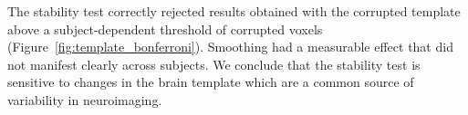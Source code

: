 \documentclass[lettersize,journal]{IEEEtran}
\newcommand{\TG}[1]{\color{orange}\textsc{From Tristan:} #1\color{black}\xspace}
\begin{document}
The stability test correctly rejected results obtained with the corrupted template above a subject-dependent threshold of corrupted voxels (Figure~\ref{fig:template_bonferroni}). Smoothing had a measurable effect that did not manifest clearly across subjects. We conclude that the stability test is sensitive to changes in the brain template which are a common source of variability in neuroimaging.

\end{document}
